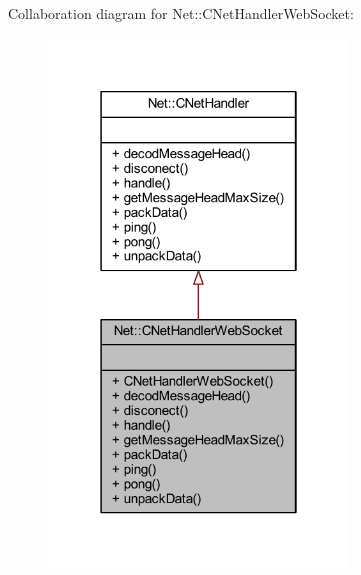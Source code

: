 Collaboration diagram for Net\+:\+:C\+Net\+Handler\+Web\+Socket\+:
\nopagebreak
\begin{figure}[H]
\begin{center}
\leavevmode
\includegraphics[width=226pt]{class_net_1_1_c_net_handler_web_socket__coll__graph}
\end{center}
\end{figure}
